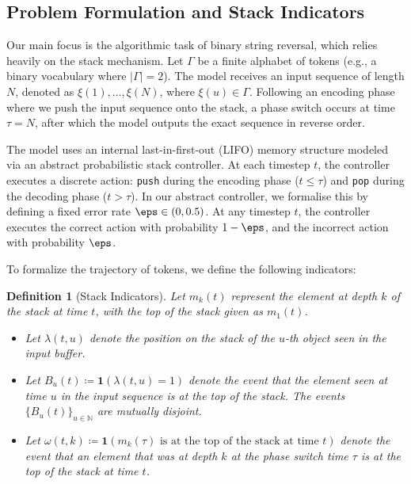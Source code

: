 \documentclass[10pt]{article} %
\newtheorem{definition}[theorem]{Definition}
\begin{document}
\subsection{Problem Formulation and Stack Indicators}

Our main focus is the algorithmic task of binary string reversal, which relies heavily on the stack mechanism. Let $\Gamma$ be a finite alphabet of tokens (e.g., a binary vocabulary where $|\Gamma| = 2$). The model receives an input sequence of length $N$, denoted as $\xi(1), \dots, \xi(N)$, where $\xi(u) \in \Gamma$. Following an encoding phase where we push the input sequence onto the stack, a phase switch occurs at time $\tau = N$, after which the model outputs the exact sequence in reverse order. 

The model uses an internal last-in-first-out (LIFO) memory structure modeled via an abstract probabilistic stack controller. At each timestep $t$, the controller executes a discrete action: \texttt{push} during the encoding phase ($t \leq \tau$) and \texttt{pop} during the decoding phase ($t > \tau$). In our abstract controller, we formalise this by defining a fixed error rate $\eps \in (0,0.5)$. At any timestep $t$, the controller executes the correct action with probability $1-\eps$, and the incorrect action with probability $\eps$.

To formalize the trajectory of tokens, we define the following indicators:

\begin{definition}[Stack Indicators]
Let $m_k(t)$ represent the element at depth $k$ of the stack at time $t$, with the top of the stack given as $m_1(t)$. 
\begin{itemize}
    \item Let $\lambda(t,u)$ denote the position on the stack of the $u$-th object seen in the input buffer.
    \item Let $B_u(t) \coloneqq \mathbf{1}(\lambda(t,u) = 1)$ denote the event that the element seen at time $u$ in the input sequence is at the top of the stack. The events $\{B_u(t)\}_{u \in \mathbb{N}}$ are mutually disjoint.
    \item Let $\omega(t,k) \coloneqq \mathbf{1}(m_k(\tau) \text{ is at the top of the stack at time } t)$ denote the event that an element that was at depth $k$ at the phase switch time $\tau$ is at the top of the stack at time $t$.
\end{itemize}
\end{definition}
\end{document}
